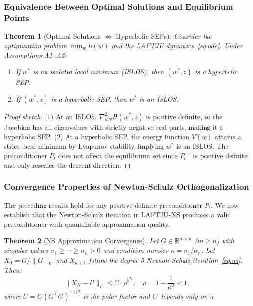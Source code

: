 \documentclass[10pt,twocolumn]{article}
\newtheorem{theorem}{Theorem}
\newcommand{\method}{LAFTJU}
\newcommand{\R}{\mathbb{R}}
\begin{document}
\subsubsection{Equivalence Between Optimal Solutions and Equilibrium Points}

\begin{theorem}[Optimal Solutions $\Leftrightarrow$ Hyperbolic SEPs]
\label{thm:equivalence}
Consider the optimization problem $\min_w h(w)$ and the \method{} dynamics~\eqref{eq:ode}. Under Assumptions A1--A2:
\begin{enumerate}
\item If $w^*$ is an isolated local minimum (ISLOS), then $(w^*, z)$ is a hyperbolic SEP.
\item If $(w^*, z)$ is a hyperbolic SEP, then $w^*$ is an ISLOS.
\end{enumerate}
\end{theorem}

\begin{proof}[Proof sketch]
(1) At an ISLOS, $\nabla^2_{ww} H(w^*,z)$ is positive definite, so the Jacobian has all eigenvalues with strictly negative real parts, making it a hyperbolic SEP. (2) At a hyperbolic SEP, the energy function $V(w)$ attains a strict local minimum by Lyapunov stability, implying $w^*$ is an ISLOS. The preconditioner $P_t$ does not affect the equilibrium set since $P_t^{-1}$ is positive definite and only rescales the descent direction.
\end{proof}

\subsubsection{Convergence Properties of Newton-Schulz Orthogonalization}

The preceding results hold for any positive-definite preconditioner $P_t$. We now establish that the Newton-Schulz iteration in \method{}-NS produces a valid preconditioner with quantifiable approximation quality.

\begin{theorem}[NS Approximation Convergence]
\label{thm:ns}
Let $G \in \R^{m \times n}$ ($m \geq n$) with singular values $\sigma_1 \geq \cdots \geq \sigma_n > 0$ and condition number $\kappa = \sigma_1/\sigma_n$. Let $X_0 = G/\|G\|_F$ and $X_{k+1}$ follow the degree-5 Newton-Schulz iteration~\eqref{eq:ns}. Then:
\begin{equation}
\|X_K - U\|_F \leq C \cdot \rho^{5^K}, \quad \rho = 1 - \frac{1}{\kappa^2} < 1,
\end{equation}
where $U = G(G^\top G)^{-1/2}$ is the polar factor and $C$ depends only on $n$.
\end{theorem}
\end{document}
